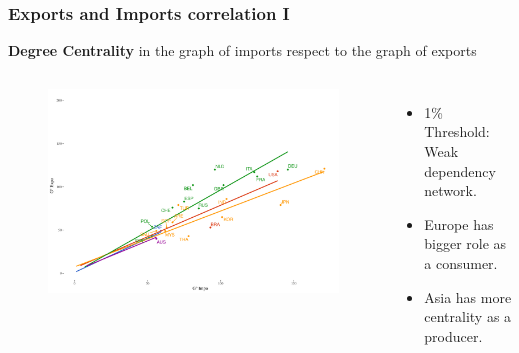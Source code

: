 \documentclass[professionalfont,fleqn]{beamer}
\begin{document}
		
	\begin{frame}
		\frametitle{Exports and Imports correlation I}
		
		
		\textbf{Degree Centrality} in the graph of imports respect to the graph of exports
		\begin{columns}[c] %
		\begin{flushleft}
			\begin{figure}
				\includegraphics[width=\linewidth]{corr_grados_2011_1_pcnt}
			\end{figure}
		\end{flushleft}
		
		
		\begin{itemize}
			\item 1\% Threshold: Weak dependency network.
			\item Europe has bigger role as a consumer.
			\item Asia has more centrality as a producer.
		\end{itemize}
		\end{columns}
	\end{frame}
\end{document}
